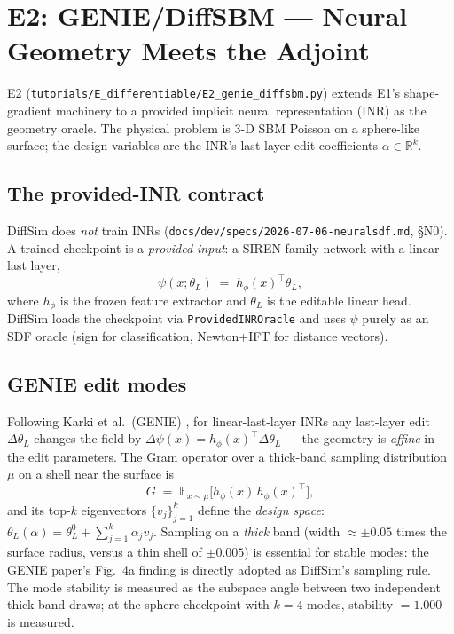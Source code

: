 \documentclass[11pt]{article}
\newcommand{\RR}{\mathbb{R}}
\begin{document}
\section{E2: GENIE/DiffSBM --- Neural Geometry Meets the Adjoint}
\label{sec:e2}

E2 (\texttt{tutorials/E\_differentiable/\allowbreak E2\_genie\_diffsbm.py})
extends E1's shape-gradient machinery to a provided implicit neural
representation (INR) as the geometry oracle.  The physical problem is
3-D SBM Poisson on a sphere-like surface; the design variables are the
INR's last-layer edit coefficients $\alpha \in \RR^k$.

\subsection{The provided-INR contract}
\label{sec:e2inr}

DiffSim does \emph{not} train INRs
(\texttt{docs/dev/specs/2026-07-06-neuralsdf.md}, \S N0).
A trained checkpoint is a \emph{provided input}: a SIREN-family network
with a linear last layer,
\begin{equation}
  \psi(x;\theta_L) \;=\; h_\phi(x)^\top \theta_L,
  \label{eq:inrpsi}
\end{equation}
where $h_\phi$ is the frozen feature extractor and $\theta_L$ is the
editable linear head.  DiffSim loads the checkpoint via
\texttt{ProvidedINROracle} and uses $\psi$ purely as an SDF oracle
(sign for classification, Newton+IFT for distance vectors).

\subsection{GENIE edit modes}
\label{sec:e2genie}

Following Karki et al.\ (GENIE) \cite{karki2025}, for linear-last-layer
INRs any last-layer edit $\Delta\theta_L$ changes the field by
$\Delta\psi(x) = h_\phi(x)^\top \Delta\theta_L$ --- the geometry is
\emph{affine} in the edit parameters.  The Gram operator over a
thick-band sampling distribution $\mu$ on a shell near the surface is
\begin{equation}
  G \;=\; \mathbb{E}_{x \sim \mu}\!\bigl[h_\phi(x)\, h_\phi(x)^\top\bigr],
  \label{eq:gram}
\end{equation}
and its top-$k$ eigenvectors $\{v_j\}_{j=1}^k$ define the \emph{design
space}: $\theta_L(\alpha) = \theta_L^0 + \sum_{j=1}^k \alpha_j v_j$.
Sampling on a \emph{thick} band (width $\approx \pm 0.05$ times the
surface radius, versus a thin shell of $\pm 0.005$) is essential for
stable modes: the GENIE paper's Fig.~4a finding is directly adopted as
DiffSim's sampling rule.  The mode stability is measured as the
subspace angle between two independent thick-band draws; at the sphere
checkpoint with $k=4$ modes, stability $= 1.000$ is measured.
\end{document}

